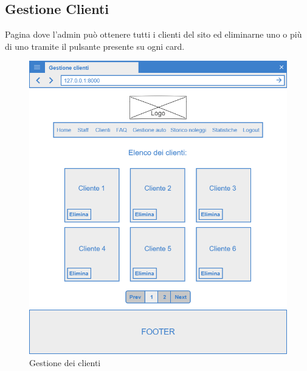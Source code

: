\documentclass[12pt,a4paperS]{report}
\begin{document}
\begin{normalsize}
			\subsection{Gestione Clienti}
				Pagina dove l'admin può ottenere tutti i clienti del sito ed eliminarne uno o più di uno tramite il pulsante presente su ogni card.	
				\begin{figure}[H]
					\centering
					\includegraphics[width=1\textwidth, height=1\textheight, keepaspectratio]{Mockup/Gestione_clienti.png}
					\caption{Gestione dei clienti}
				\end{figure}
		

\end{normalsize}
\end{document}
